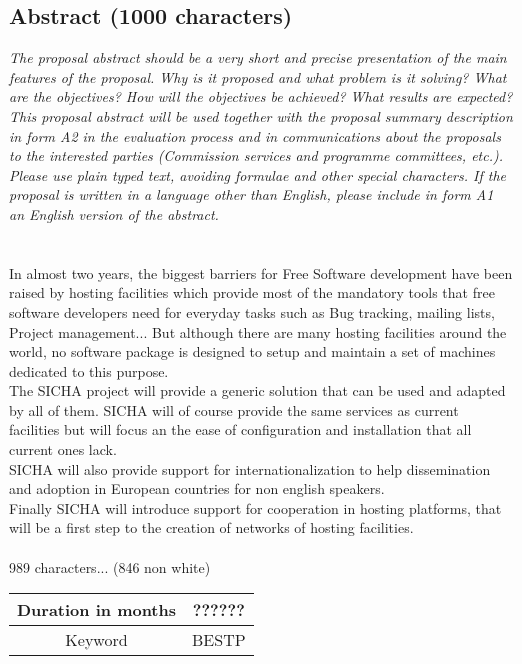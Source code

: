 \documentclass[a4paper,11pt]{report}
\begin{document}
\subsection*{Abstract (1000 characters)}
\textit{The proposal abstract should be a very short and precise presentation
of the main features of the proposal. Why is it proposed and what problem is it
solving? What are the objectives? How will the objectives be achieved? What
results are expected? This proposal abstract will be used together with the
proposal summary description in form A2 in the evaluation process and in
communications about the proposals to the interested parties (Commission
services and programme committees, etc.). Please use plain typed text, avoiding
formulae and other special characters. If the proposal is written in a language
other than English, please include in form A1 an English version of the
abstract.} \\ \\ \\
In almost two years, the biggest barriers for Free Software development have
been raised by hosting facilities which provide most of the mandatory tools
that free software developers need for everyday tasks such as Bug tracking,
mailing lists, Project management... But although there are many hosting
facilities around the world, no software package is designed to setup and
maintain a set of machines dedicated to this purpose. \\ 
The SICHA project will provide a generic solution that can be used and adapted
by all of them.  SICHA will of course provide the same services as current
facilities but will focus an the ease of configuration and installation that
all current ones lack. \\
SICHA will also provide support for internationalization to help dissemination
and adoption in European countries for non english speakers.\\ Finally SICHA
will introduce support for cooperation in hosting platforms, that will be a
first step to the creation of networks of hosting facilities. 
\\ \\ 
989 characters... (846 non white) \\
\begin{tabular}{|c|c|}
\hline
Duration in months & ?????? \\ \hline
Keyword & BESTP \\ \hline
\end{tabular}
\end{document}
